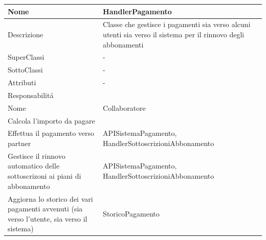 \begin{center}
    \begin{longtable}{ |p{3cm}|p{3cm}|p{3cm}|p{3cm}| }
        \hline
        Nome & \multicolumn{3}{|p{9cm}|}{HandlerPagamento} \\\hline
        Descrizione & \multicolumn{3}{|p{9cm}|}{Classe che gestisce i pagamenti sia verso alcuni utenti sia verso il sistema per il rinnovo degli abbonamenti } \\\hline
        SuperClassi & \multicolumn{3}{|p{9cm}|}{-} \\\hline
        SottoClassi & \multicolumn{3}{|p{9cm}|}{-} \\\hline
        Attributi & \multicolumn{3}{|p{9cm}|}{-} \\\hline
        \multicolumn{4}{|p{12cm}|}{Responsabilit\'a} \\\hline
        \multicolumn{2}{|p{6cm}|}{Nome} & \multicolumn{2}{|p{6cm}|}{Collaboratore} \\\hline
        \multicolumn{2}{|p{6cm}|}{Calcola l'importo da pagare} & \multicolumn{2}{|p{6cm}|}{} \\\hline
        \multicolumn{2}{|p{6cm}|}{Effettua il pagamento verso partner} & \multicolumn{2}{|p{6cm}|}{APISistemaPagamento, HandlerSottoscrizioniAbbonamento} \\\hline
        \multicolumn{2}{|p{6cm}|}{Gestisce il rinnovo automatico delle sottoscrizoni ai piani di abbonamento} & \multicolumn{2}{|p{6cm}|}{APISistemaPagamento, HandlerSottoscrizioniAbbonamento} \\\hline
        \multicolumn{2}{|p{6cm}|}{Aggiorna lo storico dei vari pagamenti avvenuti (sia verso l'utente, sia verso il sistema)} & \multicolumn{2}{|p{6cm}|}{StoricoPagamento} \\\hline
    \end{longtable}
\end{center}

